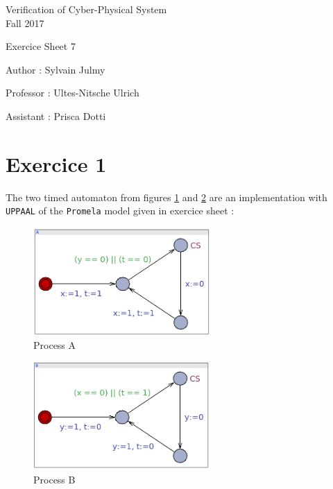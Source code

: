 \documentclass[a4paper,11pt]{report}
\author{Sylvain Julmy}
\date{\today}
\begin{document}
\begin{center}
  \Large{
    Verification of Cyber-Physical System\\
    Fall 2017
  }
  
  \noindent\makebox[\linewidth]{\rule{\linewidth}{0.4pt}}
  Exercice Sheet 7

  \vspace*{1.4cm}

  Author : Sylvain Julmy
  \noindent\makebox[\linewidth]{\rule{\linewidth}{0.4pt}}

  \begin{flushleft}
    Professor : Ultes-Nitsche Ulrich
    
    Assistant : Prisca Dotti
  \end{flushleft}

  \noindent\makebox[\linewidth]{\rule{\textwidth}{1pt}}
\end{center}

\section*{Exercice 1}

The two timed automaton from figures \ref{fig:processA} and \ref{fig:processB}
are an implementation with \texttt{UPPAAL} of the \texttt{Promela} model given
in exercice sheet :

\begin{figure}[h]
  \centering
  \includegraphics[width=0.6\textwidth]{figures/ex1_a}
  \caption{Process A}
  \label{fig:processA}
\end{figure}

\begin{figure}[h]
  \centering
  \includegraphics[width=0.6\textwidth]{figures/ex1_b}
  \caption{Process B}
  \label{fig:processB}
\end{figure}
\end{document}
